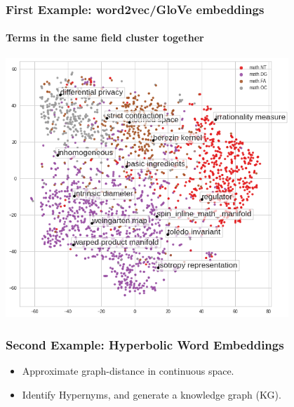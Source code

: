 \documentclass{beamer}
\begin{document}
\begin{frame}
    \frametitle{First Example: word2vec/GloVe embeddings}
    \framesubtitle{Terms in the same field cluster together}
    \begin{center}
        \includegraphics[width=0.8\textwidth]{../scatter_plot/scatter_option5_light.png}
    \end{center}
\end{frame}

\begin{frame}
    \frametitle{Second Example: Hyperbolic Word Embeddings}
    \begin{center}
    
\end{center}
    \begin{itemize}
        \item Approximate graph-distance in continuous space.
            \pause
        \item Identify Hypernyms, and generate a knowledge graph (KG).
    \end{itemize}
\end{frame}
\end{document}
